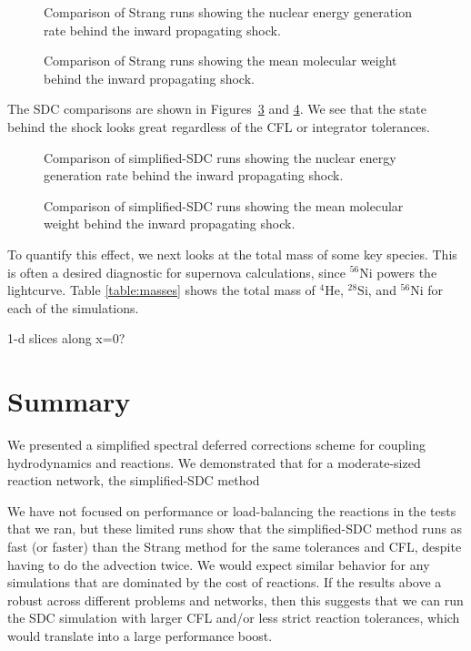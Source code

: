 \documentclass[times,preprint]{aastex63}
\newcommand{\isot}[2]{$^{#2}\mathrm{#1}$}
\begin{document}
\begin{figure}
\caption{\label{fig:strang_enuc_summary} Comparison of Strang runs showing
the nuclear energy generation rate behind the inward propagating
shock.}
\end{figure}

\begin{figure}
\caption{\label{fig:strang_abar_summary} Comparison of Strang runs showing
the mean molecular weight behind the inward propagating
shock.}
\end{figure}

The SDC comparisons are shown in Figures~\ref{fig:sdc_enuc_summary}
and \ref{fig:sdc_abar_summary}.  We see that the state behind the
shock looks great regardless of the CFL or integrator tolerances.

\begin{figure}
\caption{\label{fig:sdc_enuc_summary} Comparison of simplified-SDC runs showing
the nuclear energy generation rate behind the inward propagating
shock.}
\end{figure}

\begin{figure}
\caption{\label{fig:sdc_abar_summary} Comparison of simplified-SDC runs showing
the mean molecular weight behind the inward propagating
shock.}
\end{figure}


To quantify this effect, we next looks at the total mass of some key species.
This is often a desired diagnostic for supernova calculations, since 
\isot{Ni}{56} powers the lightcurve.  Table \ref{table:masses} shows the total
mass of \isot{He}{4}, \isot{Si}{28}, and \isot{Ni}{56} for each of the
simulations.


1-d slices along x=0?


\section{Summary}

We presented a simplified spectral deferred corrections scheme for coupling
hydrodynamics and reactions.  We demonstrated that for a moderate-sized reaction
network, the simplified-SDC method 

We have not focused on performance or load-balancing the reactions in
the tests that we ran, but these limited runs show that the
simplified-SDC method runs as fast (or faster) than the Strang method
for the same tolerances and CFL, despite having to do the advection
twice.  We would expect similar behavior for any simulations that are
dominated by the cost of reactions.  If the results above a robust across
different problems and networks, then this suggests that we can run 
the SDC simulation with larger CFL and/or less strict reaction tolerances,
which would translate into a large performance boost.
\end{document}
